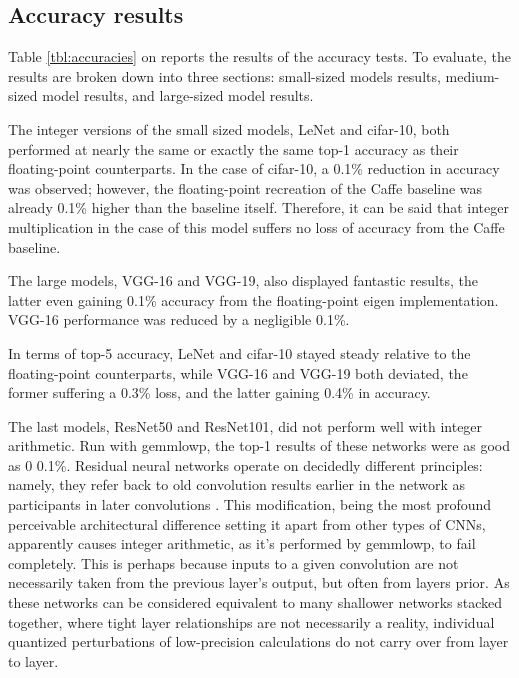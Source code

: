 \subsection{Accuracy results}
Table \ref{tbl:accuracies} on \pageref{tbl:accuracies} reports the results of the accuracy tests. To evaluate, the results are broken down into three sections: small-sized models results, medium-sized model results, and large-sized model results.

The integer versions of the small sized models, LeNet and cifar-10, both performed at nearly the same or exactly the same top-1 accuracy as their floating-point counterparts. In the case of cifar-10, a 0.1\% reduction in accuracy was observed; however, the floating-point recreation of the Caffe baseline was already 0.1\% higher than the baseline itself. Therefore, it can be said that integer multiplication in the case of this model suffers no loss of accuracy from the Caffe baseline.

The large models, VGG-16 and VGG-19, also displayed fantastic results, the latter even gaining 0.1\% accuracy from the floating-point eigen implementation. VGG-16 performance was reduced by a negligible 0.1\%.

In terms of top-5 accuracy, LeNet and cifar-10 stayed steady relative to the floating-point counterparts, while VGG-16 and VGG-19 both deviated, the former suffering a 0.3\% loss, and the latter gaining 0.4\% in accuracy.

The last models, ResNet50 and ResNet101, did not perform well with integer arithmetic. Run with gemmlowp, the top-1 results of these networks were as good as 0\/ 0.1\%. Residual neural networks operate on decidedly different principles: namely, they refer back to old convolution results earlier in the network as participants in later convolutions \cite{resnets2}. This modification, being the most profound perceivable architectural difference setting it apart from other types of CNNs, apparently causes integer arithmetic, as it's performed by gemmlowp, to fail completely. This is perhaps because inputs to a given convolution are not necessarily taken from the previous layer's output, but often from layers prior. As these networks can be considered equivalent to many shallower networks stacked together, where tight layer relationships are not necessarily a reality, individual quantized perturbations of low-precision calculations do not carry over from layer to layer.

